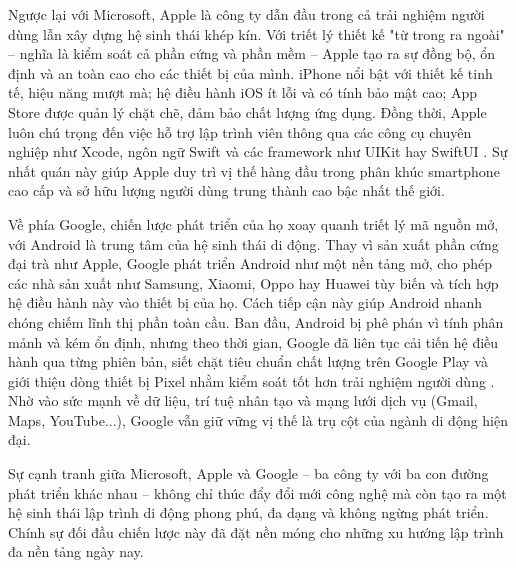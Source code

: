    \begin{flushleft}
      \hspace*{0.8cm}Ngược lại với Microsoft, Apple là công ty dẫn đầu trong cả trải nghiệm người dùng lẫn xây dựng hệ sinh thái khép kín. Với triết lý thiết kế "từ trong ra ngoài" – nghĩa là kiểm soát cả phần cứng và phần mềm – Apple tạo ra sự đồng bộ, ổn định và an toàn cao cho các thiết bị của mình. iPhone nổi bật với thiết kế tinh tế, hiệu năng mượt mà; hệ điều hành iOS ít lỗi và có tính bảo mật cao; App Store được quản lý chặt chẽ, đảm bảo chất lượng ứng dụng. Đồng thời, Apple luôn chú trọng đến việc hỗ trợ lập trình viên thông qua các công cụ chuyên nghiệp như Xcode, ngôn ngữ Swift và các framework như UIKit hay SwiftUI \cite{apple-devtools}. Sự nhất quán này giúp Apple duy trì vị thế hàng đầu trong phân khúc smartphone cao cấp và sở hữu lượng người dùng trung thành cao bậc nhất thế giới.
    \end{flushleft}

    \begin{flushleft}
      \hspace*{0.8cm}Về phía Google, chiến lược phát triển của họ xoay quanh triết lý mã nguồn mở, với Android là trung tâm của hệ sinh thái di động. Thay vì sản xuất phần cứng đại trà như Apple, Google phát triển Android như một nền tảng mở, cho phép các nhà sản xuất như Samsung, Xiaomi, Oppo hay Huawei tùy biến và tích hợp hệ điều hành này vào thiết bị của họ. Cách tiếp cận này giúp Android nhanh chóng chiếm lĩnh thị phần toàn cầu. Ban đầu, Android bị phê phán vì tính phân mảnh và kém ổn định, nhưng theo thời gian, Google đã liên tục cải tiến hệ điều hành qua từng phiên bản, siết chặt tiêu chuẩn chất lượng trên Google Play và giới thiệu dòng thiết bị Pixel nhằm kiểm soát tốt hơn trải nghiệm người dùng \cite{android-evolution}. Nhờ vào sức mạnh về dữ liệu, trí tuệ nhân tạo và mạng lưới dịch vụ (Gmail, Maps, YouTube...), Google vẫn giữ vững vị thế là trụ cột của ngành di động hiện đại.
    \end{flushleft}

    \begin{flushleft}
      \hspace*{0.8cm}Sự cạnh tranh giữa Microsoft, Apple và Google – ba công ty với ba con đường phát triển khác nhau – không chỉ thúc đẩy đổi mới công nghệ mà còn tạo ra một hệ sinh thái lập trình di động phong phú, đa dạng và không ngừng phát triển. Chính sự đối đầu chiến lược này đã đặt nền móng cho những xu hướng lập trình đa nền tảng ngày nay.
    \end{flushleft}

